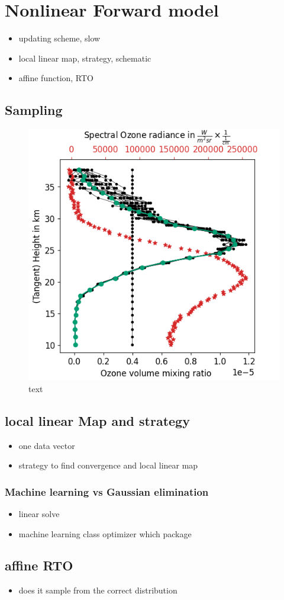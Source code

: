 \chapter{Nonlinear Forward model}
\begin{itemize}
	\item updating scheme, slow
	\item local linear map, strategy, schematic
	\item affine function, RTO
\end{itemize}

\section{Sampling}

\begin{figure}[h]
	\centering
	\includegraphics[width=\textwidth]{NonLinFirstRecRes.png}
	\caption[]{text}
	\label{fig:Results}
\end{figure}

\section{local linear Map and strategy}
\begin{itemize}
	\item one data vector
	\item strategy to find convergence and local linear map
\end{itemize}
\subsection{Machine learning vs Gaussian elimination}
\begin{itemize}
	\item linear solve
	\item machine learning class optimizer which package
\end{itemize}
\section{affine RTO}
\begin{itemize}
	\item does it sample from the correct distribution
\end{itemize}